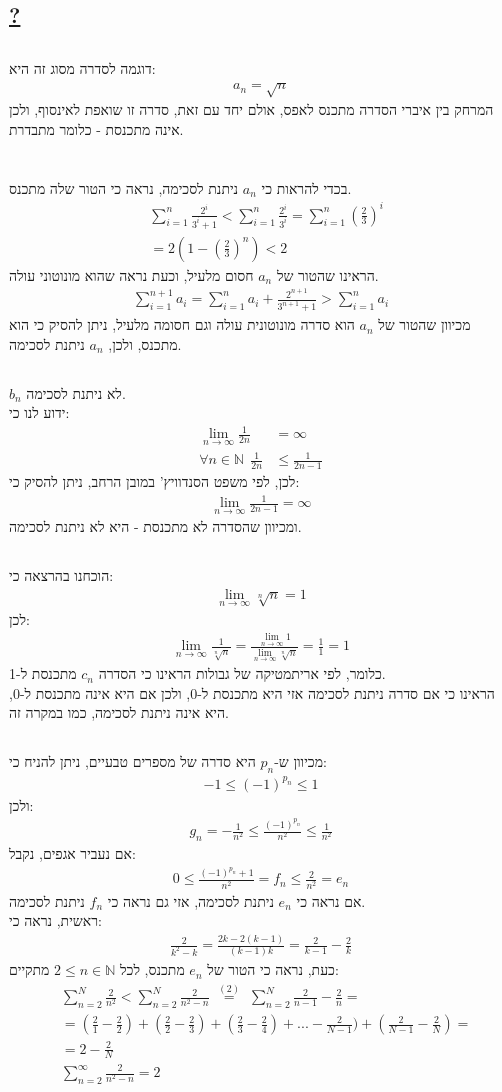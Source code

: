 \documentclass[a4paper, 12pt, leqno]{article}
\newcommand{\sub}[1]{\subsection{\underline{#1}}}
\newcommand{\N}{\ensuremath{\mathbb{N}}}
\newcommand{\eqbcuz}[1]{\text{~$\stackrel{(#1)}{=}$~}}
\newcommand{\eq}[1]{\begin{align*}#1\end{align*}}
\newcommand{\eqn}[1]{\begin{align}#1\end{align}}
\newcommand{\limn}{\lim_{n\to\infty}}
\newcommand{\sumn}{\sum^{n}_{i=1}}
\renewcommand{\leq}{\leqslant}
\begin{document}
\section{}
\sub{?}
\sub{}
דוגמה לסדרה מסוג זה היא:
\eq{
    a_n=\sqrt{n}
}
המרחק בין איברי הסדרה מתכנס לאפס, אולם יחד עם זאת, סדרה זו שואפת לאינסוף, ולכן אינה מתכנסת - כלומר מתבדרת.

\setcounter{section}{4}
\section{}
\sub{}
בכדי להראות כי $a_n$ ניתנת לסכימה, נראה כי הטור שלה מתכנס.
\eq{
    &\sumn\frac{2^i}{3^i+1}<\sumn\frac{2^i}{3^i}=\sumn(\frac{2}{3})^i\\
    &=2(1-(\frac{2}{3})^n)<2
}
הראינו שהטור של $a_n$ חסום מלעיל, וכעת נראה שהוא מונוטוני עולה.\\
\eq{
    \sum^{n+1}_{i=1}a_i=\sum^{n}_{i=1}a_i+\frac{2^{n+1}}{3^{n+1}+1}>\sum^{n}_{i=1}a_i
}
מכיוון שהטור של $a_n$ הוא סדרה מונוטונית עולה וגם חסומה מלעיל, ניתן להסיק כי הוא מתכנס, ולכן, $a_n$ ניתנת לסכימה.
\sub{}
$b_n$ לא ניתנת לסכימה.\\
ידוע לנו כי:
\eq{
    \limn{\frac{1}{2n}}&=\infty\\
    \forall{n}\in\N~~\frac{1}{2n}&\leq\frac{1}{2n-1}
}
לכן, לפי משפט הסנדוויץ' במובן הרחב, ניתן להסיק כי:
\eq{
    \limn{\frac{1}{2n-1}}=\infty
}
ומכיוון שהסדרה לא מתכנסת - היא לא ניתנת לסכימה.
\sub{}
הוכחנו בהרצאה כי:
\eqn{
    \limn\sqrt[n]{n}=1
}
לכן:
\eq{
    \limn{\frac{1}{\sqrt[n]{n}}}=\frac{\limn{1}}{\limn{\sqrt[n]{n}}}=\frac{1}{1}=1
}
כלומר, לפי אריתמטיקה של גבולות הראינו כי הסדרה $c_n$ מתכנסת ל-1.\\
הראינו כי אם סדרה ניתנת לסכימה אזי היא מתכנסת ל-0, ולכן אם היא אינה מתכנסת ל-0, היא אינה ניתנת לסכימה, כמו במקרה זה.
\pagebreak\sub{}
\setcounter{equation}{0}
מכיוון ש-$p_n$ היא סדרה של מספרים טבעיים, ניתן להניח כי:
\eq{
    -1\leq(-1)^{p_n}\leq1
}
ולכן:
\eq{
    g_n=-\frac{1}{n^2}\leq\frac{(-1)^{p_n}}{n^2}\leq\frac{1}{n^2}
}
אם נעביר אגפים, נקבל:
\eqn{
    0\leq\frac{(-1)^{p_n}+1}{n^2}=f_n\leq\frac{2}{n^2}=e_n
}
אם נראה כי $e_n$ ניתנת לסכימה, אזי גם נראה כי $f_n$ ניתנת לסכימה.\\
ראשית, נראה כי:
\eqn{
    \frac{2}{k^2-k}=\frac{2k-2(k-1)}{(k-1)k}=\frac{2}{k-1}-\frac{2}{k}
}
כעת, נראה כי הטור של $e_n$ מתכנס, לכל $2\leq{n}\in\N$ מתקיים:
\eq{
    &\sum^N_{n=2}\frac{2}{n^2}<\sum^N_{n=2}\frac{2}{n^2-n}\eqbcuz{2}\sum^N_{n=2}\frac{2}{n-1}-\frac{2}{n}=\\
    &=(\frac{2}{1}-\frac{2}{2})+(\frac{2}{2}-\frac{2}{3})+(\frac{2}{3}-\frac{2}{4})+...-\frac{2}{N-1})+(\frac{2}{N-1}-\frac{2}{N})=\\
    &=2-\frac{2}{N}\\
    &\sum^\infty_{n=2}\frac{2}{n^2-n}=2
}
\end{document}
